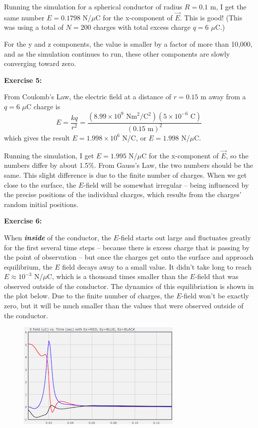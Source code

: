 \documentclass[]{article}
\begin{document}
Running the simulation for a spherical conductor of radius \(R = 0.1\)
m, I get the same number \(E = 0.1798\) N/\(\mu\)C for the x-component
of \(\vec{E}\). This is good! (This was using a total of \(N=200\)
charges with total excess charge \(q=6\) \(\mu\)C.)

For the y and z components, the value is smaller by a factor of more
than 10,000, and as the simulation continues to run, these other
components are slowly converging toward zero.

\textbf{Exercise 5:}

From Coulomb's Law, the electric field at a distance of \(r = 0.15\) m
away from a \(q=6\) \(\mu\)C charge is
\[E = \frac{kq}{r^2} = \frac{(8.99\times 10^9\textrm{ Nm$^2$/C$^2$})(5\times 10^{-6}\textrm{ C})}{(0.15\textrm{ m})^2}\]
which gives the result \(E = 1.998 \times 10^6\) N/C, or \(E = 1.998\)
N/\(\mu\)C.

Running the simulation, I get \(E = 1.995\) N/\(\mu\)C for the
x-component of \(\vec{E}\), so the numbers differ by about 1.5\%. From
Gauss's Law, the two numbers should be the same. This slight difference
is due to the finite number of charges. When we get close to the
surface, the \(E\)-field will be somewhat irregular -- being influenced
by the precise positions of the individual charges, which results from
the charges' random initial positions.

\textbf{Exercise 6:}

When \textbf{\emph{inside}} of the conductor, the \(E\)-field starts out
large and fluctuates greatly for the first several time steps -- because
there is excess charge that is passing by the point of observation --
but once the charges get onto the surface and approach equilibrium, the
\(E\) field decays away to a small value. It didn't take long to reach
\(E \approx 10^{-3}\) N/\(\mu\)C, which is a thousand times smaller than
the \(E\)-field that was observed outside of the conductor. The dynamics
of this equilibriation is shown in the plot below. Due to the finite
number of charges, the \(E\)-field won't be exactly zero, but it will be
much smaller than the values that were observed outside of the
conductor.

\begin{figure}[htbp]
\centering
\includegraphics{images/EFieldInsideSphere.png}
\caption{}
\end{figure}
\end{document}
